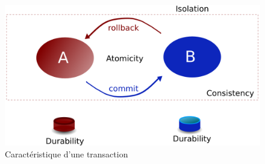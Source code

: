 {  \begin{figure}[hb]
    \begin{center}
      \includegraphics[scale=0.4]{img/transaction.png}
      \caption{Caractéristique d'une transaction}
      \label{tx}
    \end{center}
  \end{figure}
}



